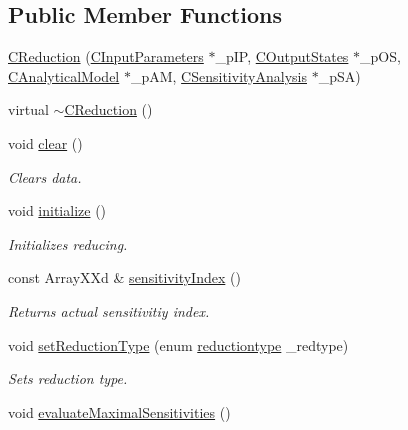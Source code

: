 \subsection*{Public Member Functions}
\begin{DoxyCompactItemize}
\item 
\hyperlink{class_go_s_u_m_1_1_c_reduction_ac5471e43eb888c8d5208eab8f6f796c6}{C\-Reduction} (\hyperlink{class_go_s_u_m_1_1_c_input_parameters}{C\-Input\-Parameters} $\ast$\-\_\-p\-I\-P, \hyperlink{class_go_s_u_m_1_1_c_output_states}{C\-Output\-States} $\ast$\-\_\-p\-O\-S, \hyperlink{class_go_s_u_m_1_1_c_analytical_model}{C\-Analytical\-Model} $\ast$\-\_\-p\-A\-M, \hyperlink{class_go_s_u_m_1_1_c_sensitivity_analysis}{C\-Sensitivity\-Analysis} $\ast$\-\_\-p\-S\-A)
\item 
virtual \hyperlink{class_go_s_u_m_1_1_c_reduction_a66434864be45cecb311c066943b2f303}{$\sim$\-C\-Reduction} ()
\item 
void \hyperlink{class_go_s_u_m_1_1_c_reduction_a8ff18c5673de6fee90a48bc205f0b1b0}{clear} ()
\begin{DoxyCompactList}\small\item\em Clears data. \end{DoxyCompactList}\item 
void \hyperlink{class_go_s_u_m_1_1_c_reduction_a72575687b04e3ee89d677551f1ded8c0}{initialize} ()
\begin{DoxyCompactList}\small\item\em Initializes reducing. \end{DoxyCompactList}\item 
const Array\-X\-Xd \& \hyperlink{class_go_s_u_m_1_1_c_reduction_af73a94c49520b7e4227c2d281cea8660}{sensitivity\-Index} ()
\begin{DoxyCompactList}\small\item\em Returns actual sensitivitiy index. \end{DoxyCompactList}\item 
void \hyperlink{class_go_s_u_m_1_1_c_reduction_a1983f9e7efe12472ec9ca99cc79c3349}{set\-Reduction\-Type} (enum \hyperlink{class_go_s_u_m_1_1_c_reduction_a191434138cff8df283fa2c2e2a8e653a}{reductiontype} \-\_\-redtype)
\begin{DoxyCompactList}\small\item\em Sets reduction type. \end{DoxyCompactList}\item 
void \hyperlink{class_go_s_u_m_1_1_c_reduction_af929c1f6cc529a5a8c50dde580b275cd}{evaluate\-Maximal\-Sensitivities} ()

\end{DoxyCompactItemize}
